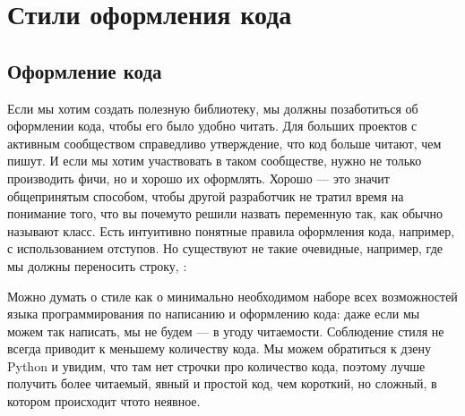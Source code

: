 \documentclass[letterpaper,10pt,russian]{sphinxmanual}
\begin{document}
\chapter{Стили оформления кода}
\label{\detokenize{index:id6}}
\sphinxstepscope


\section{Оформление кода}
\label{\detokenize{educational_materials/styles/content:id1}}\label{\detokenize{educational_materials/styles/content::doc}}
\sphinxAtStartPar
Если мы хотим создать полезную библиотеку, мы должны позаботиться об оформлении кода, чтобы его было удобно читать. Для больших проектов с активным сообществом справедливо утверждение, что код больше читают, чем пишут. И если мы хотим участвовать в таком сообществе, нужно не только производить фичи, но и хорошо их оформлять. Хорошо — это значит общепринятым способом, чтобы другой разработчик не тратил время на понимание того, что вы почему\sphinxhyphen{}то решили назвать переменную так, как обычно называют класс. Есть интуитивно понятные правила оформления кода, например, с использованием отступов. Но существуют не такие очевидные, например, где мы должны переносить строку, :

\begin{sphinxVerbatim}[commandchars=\\\{\}]
   
           
             
           

  
           
             
           
           
\end{sphinxVerbatim}

\sphinxAtStartPar
Можно думать о стиле как о минимально необходимом наборе всех возможностей языка программирования по написанию и оформлению кода: даже если мы можем так написать, мы не будем — в угоду читаемости. Соблюдение стиля не всегда приводит к меньшему количеству кода. Мы можем обратиться к дзену Python и увидим, что там нет строчки про количество кода, поэтому лучше получить более читаемый, явный и простой код, чем короткий, но сложный, в котором происходит что\sphinxhyphen{}то неявное.
\end{document}
